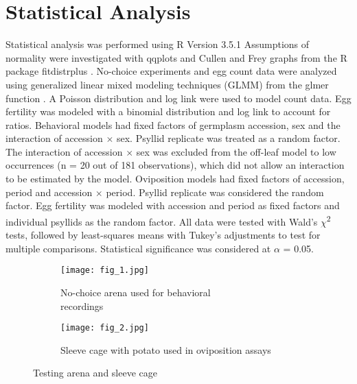 \documentclass{UIdahoMastersThesis}
\begin{document}
\section{Statistical Analysis}
\label{sec:stats}
Statistical analysis was performed using R Version 3.5.1 \autocite{RCT2013}
Assumptions of normality were investigated with qqplots and Cullen and Frey graphs from the R package {fitdistrplus} \autocite{Delignette-Muller2015}.
No-choice experiments and egg count data were analyzed using generalized linear mixed modeling techniques (GLMM) \autocite{Stroup2015} from the {glmer} function \autocite{Bates2015}. A Poisson distribution and log link were used to model count data. Egg fertility was modeled with a binomial distribution and log link to account for ratios. Behavioral models had fixed factors of germplasm accession, sex and the interaction of accession $\times$ sex. Psyllid replicate was treated as a random factor. The interaction of accession $\times$ sex was excluded from the off-leaf model to low occurrences (n = 20 out of 181 observations), which did not allow an interaction to be estimated by the model. 
Oviposition models had fixed factors of accession, period and accession $\times$ period. Psyllid replicate was considered the random factor. Egg fertility was modeled with accession and period as fixed factors and individual psyllids as the random factor. All data were tested with Wald's $\chi$\textsuperscript{2} tests, followed by least-squares means with Tukey's adjustments to test for multiple comparisons. Statistical significance was considered at $\alpha$ = 0.05.

\clearpage
\par
\begin{sidewaysfigure}[!htbp]
	\begin{subfigure}{0.5\textwidth}
		\centering
		\texttt{[image: fig\_1.jpg]}
		\caption{No-choice arena used for behavioral \\recordings}
		\label{fig:fig_1}
	\end{subfigure}%
	\begin{subfigure}{0.5\textwidth}
		\centering
		\texttt{[image: fig\_2.jpg]}
		\caption{Sleeve cage with potato used in oviposition assays}
		\label{fig:fig_2}
	\end{subfigure}
	\caption{Testing arena and sleeve cage}
\end{sidewaysfigure}
\vspace{2em}
\end{document}
